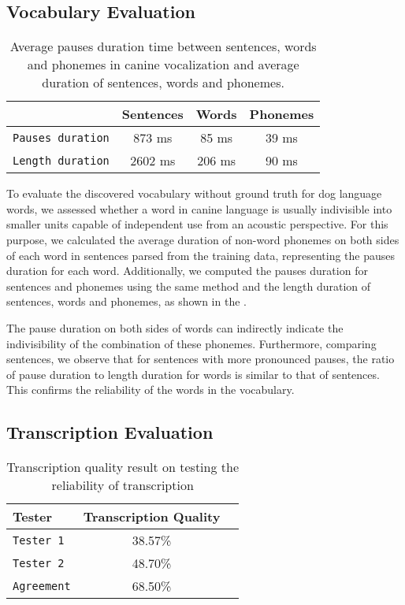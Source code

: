 \subsection{Vocabulary Evaluation}

\begin{table}[th]
\centering
\small
\begin{tabular}{lccc}
\hline
& \textbf{Sentences} & \textbf{Words} & \textbf{Phonemes} \\
\hline
\verb|Pauses duration| & 873 ms & 85 ms & 39 ms  \\\hline
\verb|Length duration| & 2602 ms & 206 ms & 90 ms \\\hline
\end{tabular}
\caption{Average pauses duration time between sentences, words and phonemes in canine vocalization and average duration of sentences, words and phonemes.}
\label{tab:vs}
\end{table}

To evaluate the discovered vocabulary without ground truth for dog language words, we assessed whether a word in canine language is usually indivisible into smaller units capable of independent use from an acoustic perspective. For this purpose, we calculated the average duration of non-word phonemes on both sides of each word in sentences parsed from the training data, representing the pauses \citet{zellner1994pauses} duration for each word. Additionally, we computed the pauses duration for sentences and phonemes using the same method and the length duration of sentences, words and phonemes, as shown in the . 

The pause duration on both sides of words can indirectly indicate the indivisibility of the combination of these phonemes. Furthermore, comparing sentences, we observe that for sentences with more pronounced pauses, the ratio of pause duration to length duration for words is similar to that of sentences. This confirms the reliability of the words in the vocabulary.


\subsection{Transcription Evaluation}

\begin{table}[th]
    \centering
    \small
\begin{tabular}{lcc}
    \hline
    \textbf{Tester} & \textbf{Transcription Quality}\\
    \hline
    \verb|Tester 1| & 38.57\% \\
    \verb|Tester 2| & 48.70\%  \\
    \verb|Agreement| & 68.50\% \\\hline
    \end{tabular}
    \caption{Transcription quality result on testing the reliability of transcription}
    \label{tab:tr}
    \end{table}


